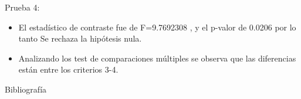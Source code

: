 \documentclass[
  ignorenonframetext,
]{beamer}
\begin{document}
\begin{frame}
\begin{block}{Prueba 4:}
\label{prueba-4}
\begin{itemize}
\item
  El estadístico de contraste fue de F=9.7692308 , y el p-valor de
  0.0206 por lo tanto Se rechaza la hipótesis nula.
\item
  Analizando los test de comparaciones múltiples se observa que las
  diferencias están entre los criterios 3-4.
\end{itemize}
\end{block}
\end{frame}

\begin{frame}{Bibliografía}
\label{bibliografuxeda}
\label{refs}
\end{frame}
\end{document}
